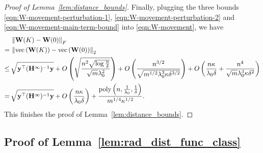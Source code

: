 \begin{proof}[Proof of Lemma~\ref{lem:distance_bounds}]
	Finally, plugging the three bounds \eqref{eqn:W-movement-perturbation-1}, \eqref{eqn:W-movement-perturbation-2} and \eqref{eqn:W-movement-main-term-bound} into \eqref{eqn:W-movement}, we have
	\begin{align*}
	& \left\|\mathbf{W}(K) - \mathbf{W}(0)\right\|_F \\
	=\,& \left\|\text{vec}\left(\mathbf{W}(K)\right) - \text{vec}\left(\mathbf{W}(0)\right) \right\|_2 \\
	\le\,& \sqrt{\mathbf{y}^\top (\mathbf{H}^\infty)^{-1} \mathbf{y}}  +    O\left( \sqrt{\frac{n^2\sqrt{\log \frac{n}{\delta}}}{\sqrt m \lambda_0^2} } \right)
		+ O\left( \frac{ n^{3/2}}{ \sqrt{m^{1/2} \lambda_0^3 \kappa \delta^{3/2}}} \right)
		+ O\left( \frac{  n \kappa}{\lambda_0 \delta} + \frac{  n^4}{\sqrt m \lambda_0^3 \kappa \delta^{2}}  \right) \\
	=\,& \sqrt{\mathbf{y}^\top (\mathbf{H}^\infty)^{-1} \mathbf{y}}  + O\left( \frac{  n \kappa}{\lambda_0 \delta} \right) + \frac{\mathrm{poly}\left(n, \frac{1}{\lambda_0}, \frac{1}{\delta} \right)}{m^{1/4} \kappa^{1/2}} .
	\end{align*}
	This finishes the proof of Lemma~\ref{lem:distance_bounds}.
\end{proof}






















\subsection{Proof of Lemma~\ref{lem:rad_dist_func_class}} \label{app:proof-lem:rad_dist_func_class}

